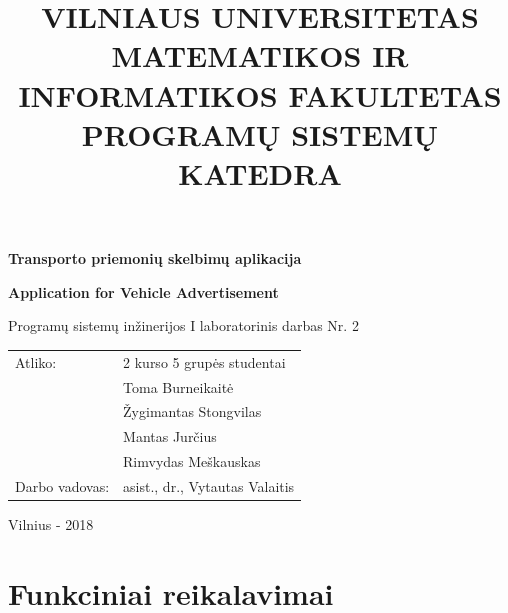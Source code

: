 \documentclass[12pt]{article}
\title{VILNIAUS UNIVERSITETAS \\
MATEMATIKOS IR INFORMATIKOS FAKULTETAS \\
PROGRAMŲ SISTEMŲ KATEDRA}
\author{}
\date{}
\begin{document}
	\clearpage
	\maketitle
	\thispagestyle{empty}

	\bigbreak
	\bigbreak
	\bigbreak
	\bigbreak

	\begin{center}
		\begin{Large}
			\textbf{Transporto priemonių skelbimų aplikacija} \\
		\end{Large}
		\begin{large}
			\textbf{Application for Vehicle Advertisement} \\
		\end{large}
		Programų sistemų inžinerijos I laboratorinis darbas Nr. 2 \\

		\bigbreak
		\bigbreak
		\bigbreak
		\bigbreak
		\bigbreak
		\bigbreak
		\bigbreak
		\bigbreak
		\bigbreak

		\begin{tabular}{ll}
			Atliko:        & 2 kurso 5 grupės studentai \\
		               	   & Toma Burneikaitė \\
		               	   & Žygimantas Stongvilas \\
		                   & Mantas Jurčius \\
		                   & Rimvydas Meškauskas \\
			Darbo vadovas: & asist., dr., Vytautas Valaitis
		\end{tabular}

		\bigbreak
		\bigbreak
		\bigbreak
		\bigbreak
		\bigbreak
		\bigbreak
		\bigbreak
		\bigbreak
		\bigbreak

		Vilnius - 2018
	\end{center}
	\pagebreak
	
	\tableofcontents
	\pagebreak	
	
	\section*{Funkciniai reikalavimai}
	
\end{document}
